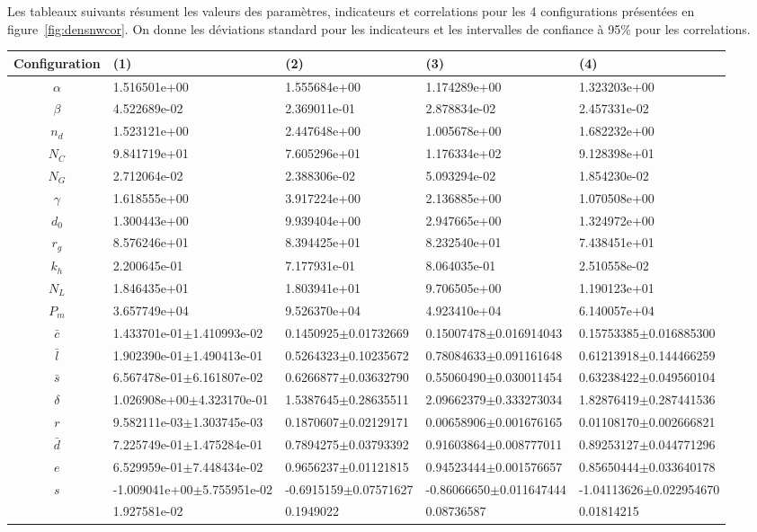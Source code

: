 Les tableaux suivants résument les valeurs des paramètres, indicateurs et correlations pour les 4 configurations présentées en figure~\ref{fig:densnwcor}. On donne les déviations standard pour les indicateurs et les intervalles de confiance à 95\% pour les correlations.

\begin{center}

\begin{tabular}{|c|p{3.7cm}|p{3.7cm}|p{3.7cm}|p{3.7cm}|}
\hline
Configuration&(1)&(2)&(3)&(4)\\\hline
$\alpha$&1.516501e+00&1.555684e+00&1.174289e+00&1.323203e+00\\
$\beta$&4.522689e-02&2.369011e-01&2.878834e-02&2.457331e-02\\
$n_d$&1.523121e+00&2.447648e+00&1.005678e+00&1.682232e+00\\
$N_C$&9.841719e+01&7.605296e+01&1.176334e+02&9.128398e+01\\
$N_G$&2.712064e-02&2.388306e-02&5.093294e-02&1.854230e-02\\
$\gamma$&1.618555e+00&3.917224e+00&2.136885e+00&1.070508e+00\\
$d_0$&1.300443e+00&9.939404e+00&2.947665e+00&1.324972e+00\\
$r_g$&8.576246e+01&8.394425e+01&8.232540e+01&7.438451e+01\\
$k_h$&2.200645e-01&7.177931e-01&8.064035e-01&2.510558e-02\\
$N_L$&1.846435e+01&1.803941e+01&9.706505e+00&1.190123e+01\\
$P_m$&3.657749e+04&9.526370e+04&4.923410e+04&6.140057e+04\\\hline
$\bar{c}$&1.433701e-01$\pm$1.410993e-02&0.1450925$\pm$0.01732669&0.15007478$\pm$0.016914043&0.15753385$\pm$0.016885300\\
$\bar{l}$&1.902390e-01$\pm$1.490413e-01&0.5264323$\pm$0.10235672&0.78084633$\pm$0.091161648&0.61213918$\pm$0.144466259\\
$\bar{s}$&6.567478e-01$\pm$6.161807e-02&0.6266877$\pm$0.03632790&0.55060490$\pm$0.030011454&0.63238422$\pm$0.049560104\\
$\delta$&1.026908e+00$\pm$4.323170e-01&1.5387645$\pm$0.28635511&2.09662379$\pm$0.333273034&1.82876419$\pm$0.287441536\\
$r$&9.582111e-03$\pm$1.303745e-03&0.1870607$\pm$0.02129171&0.00658906$\pm$0.001676165&0.01108170$\pm$0.002666821\\
$\bar{d}$&7.225749e-01$\pm$1.475284e-01&0.7894275$\pm$0.03793392&0.91603864$\pm$0.008777011&0.89253127$\pm$0.044771296\\
$e$&6.529959e-01$\pm$7.448434e-02&0.9656237$\pm$0.01121815&0.94523444$\pm$0.001576657&0.85650444$\pm$0.033640178\\
$s$&-1.009041e+00$\pm$5.755951e-02&-0.6915159$\pm$0.07571627&-0.86066650$\pm$0.011647444&-1.04113626$\pm$0.022954670\\
&1.927581e-02&0.1949022&0.08736587&0.01814215\\\hline
\end{tabular}



\end{center}

